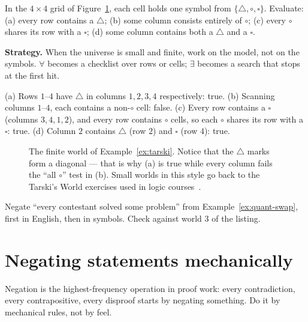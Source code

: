 \begin{example}\label{ex:tarski}
In the $4\times4$ grid of Figure~\ref{fig:tarski}, each cell holds one symbol from
$\{\triangle,\circ,\square\}$. Evaluate: (a) every row contains a $\triangle$;
(b) some column consists entirely of $\circ$; (c) every $\circ$ shares its row with
a $\square$; (d) some column contains both a $\triangle$ and a $\square$.
\par\smallskip
\textbf{Strategy.} When the universe is small and finite, work on the model, not on
the symbols. $\forall$ becomes a checklist over rows or cells; $\exists$ becomes a
search that stops at the first hit.
\par\smallskip
\begin{solution}
(a) Rows $1$--$4$ have $\triangle$ in columns $1,2,3,4$ respectively: true.
(b) Scanning columns $1$--$4$, each contains a non-$\circ$ cell: false.
(c) Every row contains a $\square$ (columns $3,4,1,2$), and every row contains
$\circ$ cells, so each $\circ$ shares its row with a $\square$: true.
(d) Column $2$ contains $\triangle$ (row $2$) and $\square$ (row $4$): true.
\end{solution}
\end{example}

\begin{figure}[ht]\centering

\caption{The finite world of Example~\ref{ex:tarski}. Notice that the $\triangle$
marks form a diagonal --- that is why (a) is true while every column fails the
``all $\circ$'' test in (b). Small worlds in this style go back to the Tarski's
World exercises used in logic courses~\cite{barwise}.}
\label{fig:tarski}
\end{figure}

\begin{exercise}[easy]\label{exr:negate-quant}
Negate ``every contestant solved some problem'' from Example~\ref{ex:quant-swap},
first in English, then in symbols. Check against world 3 of the listing.
\end{exercise}

\section{Negating statements mechanically}\label{sec:negation}

Negation is the highest-frequency operation in proof work: every contradiction,
every contrapositive, every disproof starts by negating something. Do it by
mechanical rules, not by feel.

